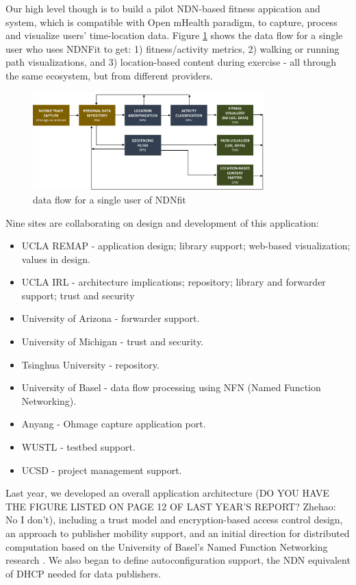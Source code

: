 \documentclass{article}
\begin{document}
Our high level though is to build a pilot NDN-based fitness appication and system, which is compatible with Open mHealth paradigm, to capture, process and visualize users' time-location data. Figure \ref{fig:dataflow} shows the data flow for a single user who uses NDNFit to get: 1) fitness/activity metrics,  2) walking or running path visualizations, and  3) location-based content during exercise - all through the same ecosystem, but from different providers. 

\begin{figure}
	\begin{center}
		\includegraphics[width=0.8\textwidth]{dataflow.png}
		\caption{data flow for a single user of NDNfit}
		\label{fig:dataflow}
	\end{center}
\end{figure}

Nine sites are collaborating on design and development of this application:
\begin{itemize}
	\item UCLA REMAP - application design; library support; web-based visualization; values in design.
	\item UCLA IRL - architecture implications; repository; library and forwarder support; trust and security
	\item University of Arizona - forwarder support.
	\item University of Michigan - trust and security.
	\item Tsinghua University - repository.
	\item University of Basel - data flow processing using NFN (Named Function Networking).
	\item Anyang - Ohmage capture application port.
	\item WUSTL - testbed support.
	\item UCSD - project management support.
\end{itemize}

Last year, we developed an overall application architecture (DO YOU HAVE THE FIGURE LISTED ON PAGE 12 OF LAST YEAR'S REPORT? Zhehao: No I don't), including a trust model and encryption-based access control design, an approach to publisher mobility support, and an initial direction for distributed computation based on the University of Basel's Named Function Networking research \cite{tschudinnamed}. We also began to define autoconfiguration support, the NDN equivalent of DHCP needed for data publishers.
\end{document}
